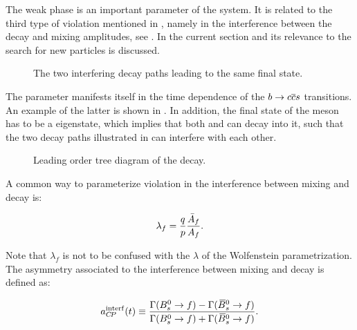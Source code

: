 The weak phase \phis is an important parameter of the \BBbarSyst system. It is related to the third
type of \CP violation mentioned in , namely in the interference between
the decay and mixing amplitudes, see . In the current section \phis and
its relevance to the search for new particles is discussed.

\newcommand{\ffig}{f}
\begin{figure}[h]
  \centering
  \resizebox{0.4\textwidth}{!}{}
  \caption{The two interfering decay paths leading to the same final state.}
  \label{interference}
\end{figure}

The parameter \phis manifests itself in the time dependence of the $b \rightarrow c\overline {c}s$ transitions.
An example of the latter is shown in . In addition, the final state of the \Bs meson has to be
a \CP eigenstate, which implies that both \Bs and \Bsb can decay into it, such that the two decay paths
illustrated in  can interfere with each other.

\begin{figure}[!h]
  \centering
  {\sffamily }
  \caption{Leading order tree diagram of the \BsJpsiPhi decay.}
  \label{bs2jpsiphi}
\end{figure}

A common way to parameterize \CP violation in the interference between mixing and decay is:

\begin{equation}
  \centering
  \lambda_{f} = \frac{q}{p} \frac{\bar{A}_f}{A_f}. %
\label{lambda_cpv}
\end{equation}

\noindent Note that $\lambda_f$ is not to be confused with the $\lambda$ of the Wolfenstein parametrization.
The asymmetry associated to the interference between mixing and decay is defined as:

\begin{equation}
  \centering
  a_{\CP}^{\rm interf}(t) \equiv \frac{\Gamma(\Bs \to f) - \Gamma(\Bsb \to f)} {\Gamma(\Bs \to f) + \Gamma(\Bsb \to f)}.
\label{cpv_interf_def}
\end{equation}

